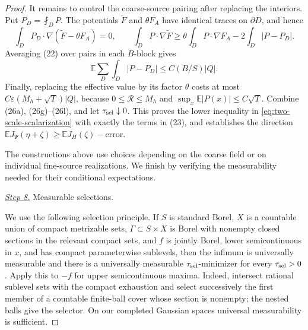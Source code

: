 \documentclass{aomart}
\theoremstyle{definition}
\newcommand{\1}{\mathbf 1}
\begin{document}
\begin{proof}
It remains to control the coarse-source pairing after replacing the
interiors.  Put $P_ D=\fint_ DP$.  The potentials
$\widetilde F$ and $\theta F_ A$ have identical traces on
$\partial D$, and hence
\begin{equation}
\int_ DP_ D\cdot\nabla(\widetilde F-\theta F_ A)=0,
\qquad
\int_ DP\cdot\nabla\widetilde F
\geq\theta\int_ DP\cdot\nabla F_ A-2\int_ D|P-P_ D|.
\tag{26k}
\end{equation}
Averaging (22) over pairs in each $B$-block gives
\begin{equation}
\mathbb E\sum_ D\int_ D|P-P_ D|\leq C(B/S)|Q|.
\tag{26l}
\end{equation}
Finally, replacing the effective value by its factor $\theta$ costs
at most $C\varepsilon(M_ h+\sqrt T)|Q|$, because
$0\leq \mathcal R\leq M_ h$ and $\sup_ x\mathbb E|P(x)|\leq C\sqrt T$.
Combine (26a), (26g)--(26l), and let $\tau_{\rm sel}\downarrow0$.  This proves
the lower inequality in \eqref{eq:two-scale-scalarization} with exactly the terms in (23), and establishes
the direction
$\mathbb EJ_ \Psi(\eta+\zeta)\geq\mathbb EJ_ H(\zeta)-\text{error}$.

The constructions above use choices depending on the coarse field or
on individual fine-source realizations.  We finish by verifying the
measurability needed for their conditional expectations.

\smallskip\noindent
\underline{\textit{Step 8.}} Measurable selections.

We use the following selection principle.  If $S$ is standard Borel, $X$ is a
countable union of compact metrizable sets, $\Gamma\subset S\times X$
is Borel with nonempty closed sections in the relevant compact sets, and
$f$ is jointly Borel, lower semicontinuous in $x$, and has compact
parameterwise sublevels, then the infimum is universally measurable and
there is a universally measurable $\tau_{\rm sel}$-minimizer for every
$\tau_{\rm sel}>0$.  Apply this to $-f$ for upper semicontinuous maxima.
Indeed, intersect rational sublevel sets with the compact exhaustion and
select successively the first member of a countable finite-ball cover
whose section is nonempty; the nested balls give the selector.  On our
completed Gaussian spaces universal measurability is sufficient.


\end{proof}
\end{document}
